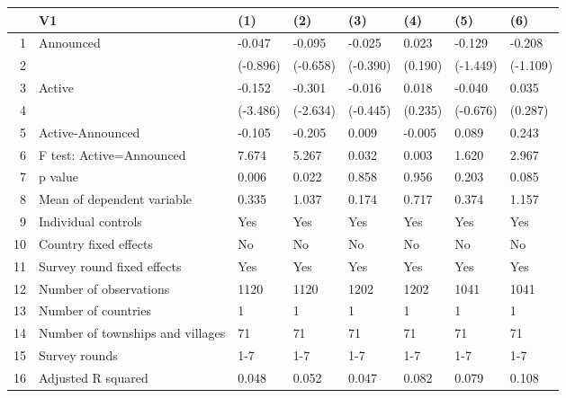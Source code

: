 \begin{table}[ht]
\centering
\begin{tabular}{rlllllll}
  \hline
 & V1 & (1) & (2) & (3) & (4) & (5) & (6) \\ 
  \hline
1 & Announced & -0.047 & -0.095 & -0.025 & 0.023 & -0.129 & -0.208 \\ 
  2 &  & (-0.896) & (-0.658) & (-0.390) & (0.190) & (-1.449) & (-1.109) \\ 
  3 & Active & -0.152 & -0.301 & -0.016 & 0.018 & -0.040 & 0.035 \\ 
  4 &  & (-3.486) & (-2.634) & (-0.445) & (0.235) & (-0.676) & (0.287) \\ 
  5 & Active-Announced & -0.105 & -0.205 & 0.009 & -0.005 & 0.089 & 0.243 \\ 
  6 & F test: Active=Announced & 7.674 & 5.267 & 0.032 & 0.003 & 1.620 & 2.967 \\ 
  7 & p value & 0.006 & 0.022 & 0.858 & 0.956 & 0.203 & 0.085 \\ 
  8 & Mean of dependent variable & 0.335 & 1.037 & 0.174 & 0.717 & 0.374 & 1.157 \\ 
  9 & Individual controls & Yes & Yes & Yes & Yes & Yes & Yes \\ 
  10 & Country fixed effects & No & No & No & No & No & No \\ 
  11 & Survey round fixed effects & Yes & Yes & Yes & Yes & Yes & Yes \\ 
  12 & Number of observations & 1120 & 1120 & 1202 & 1202 & 1041 & 1041 \\ 
  13 & Number of countries & 1 & 1 & 1 & 1 & 1 & 1 \\ 
  14 & Number of townships and villages & 71 & 71 & 71 & 71 & 71 & 71 \\ 
  15 & Survey rounds & 1-7 & 1-7 & 1-7 & 1-7 & 1-7 & 1-7 \\ 
  16 & Adjusted R squared & 0.048 & 0.052 & 0.047 & 0.082 & 0.079 & 0.108 \\ 
   \hline
\end{tabular}
\end{table}
